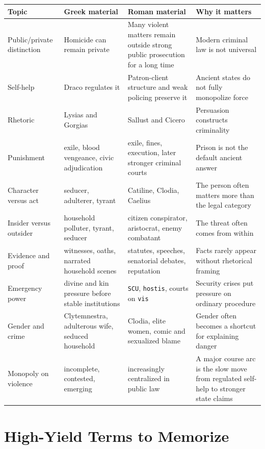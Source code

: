 \documentclass[11pt]{article}
\begin{document}
\begin{center}
\begin{tabularx}{\textwidth}{|X|X|X|X|}
\hline
\textbf{Topic} & \textbf{Greek material} & \textbf{Roman material} & \textbf{Why it matters} \\
\hline
Public/private distinction & Homicide can remain private & Many violent matters remain outside strong public prosecution for a long time & Modern criminal law is not universal \\ \hline
Self-help & Draco regulates it & Patron-client structure and weak policing preserve it & Ancient states do not fully monopolize force \\ \hline
Rhetoric & Lysias and Gorgias & Sallust and Cicero & Persuasion constructs criminality \\ \hline
Punishment & exile, blood vengeance, civic adjudication & exile, fines, execution, later stronger criminal courts & Prison is not the default ancient answer \\ \hline
Character versus act & seducer, adulterer, tyrant & Catiline, Clodia, Caelius & The person often matters more than the legal category \\ \hline
Insider versus outsider & household polluter, tyrant, seducer & citizen conspirator, aristocrat, enemy combatant & The threat often comes from within \\ \hline
Evidence and proof & witnesses, oaths, narrated household scenes & statutes, speeches, senatorial debates, reputation & Facts rarely appear without rhetorical framing \\ \hline
Emergency power & divine and kin pressure before stable institutions & \texttt{SCU}, \texttt{hostis}, courts on \texttt{vis} & Security crises put pressure on ordinary procedure \\ \hline
Gender and crime & Clytemnestra, adulterous wife, seduced household & Clodia, elite women, comic and sexualized blame & Gender often becomes a shortcut for explaining danger \\ \hline
Monopoly on violence & incomplete, contested, emerging & increasingly centralized in public law & A major course arc is the slow move from regulated self-help to stronger state claims \\ \hline
\end{tabularx}
\end{center}

\section{High-Yield Terms to Memorize}
\end{document}
